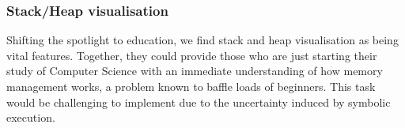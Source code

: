 \documentclass[titlepage,11pt]{article}
\begin{document}
\subsubsection{Stack/Heap visualisation}

Shifting the spotlight to education, we find stack and heap visualisation as being vital features. Together, they could provide those who are just starting their study of Computer Science with an immediate understanding of how memory management works, a problem known to baffle loads of beginners. This task would be challenging to implement due to the uncertainty induced by symbolic execution.



\end{document}
